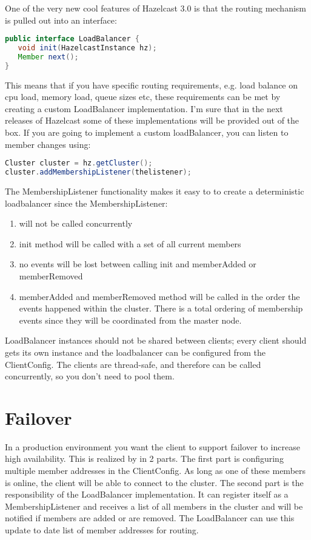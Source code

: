 One of the very new cool features of Hazelcast 3.0 is that the routing mechanism is pulled out into an interface:
\begin{lstlisting}[language=java]
public interface LoadBalancer {
   void init(HazelcastInstance hz);
   Member next();
}
\end{lstlisting}
This means that if you have specific routing requirements, e.g. load balance on cpu load, memory load, queue sizes etc, these requirements can be met by creating a custom LoadBalancer implementation. I'm sure that in the next releases of Hazelcast some of these implementations will be provided out of the box. If you are going to implement a custom loadBalancer, you can listen to member changes using:
\begin{lstlisting}[language=java]
Cluster cluster = hz.getCluster();
cluster.addMembershipListener(thelistener);
\end{lstlisting}

The MembershipListener functionality makes it easy to to create a deterministic loadbalancer since the MembershipListener:
\begin{enumerate}
\item will not be called concurrently
\item init method will be called with a set of all current members
\item no events will be lost between calling init and memberAdded or memberRemoved
\item memberAdded and memberRemoved method will be called in the order the events happened within the cluster. There is a total ordering of membership events since they will be coordinated from the master node.
\end{enumerate}

LoadBalancer instances should not be shared between clients; every client should gets its own instance and the loadbalancer can be configured from the ClientConfig. The clients are thread-safe, and therefore can be called concurrently, so you don't need to pool them.

\section{Failover} 
In a production environment you want the client to support failover to increase high availability. This is realized by in 2 parts. The first part is configuring multiple member addresses in the ClientConfig. As long as one of these members is online, the client will be able to connect to the cluster. The second part is the responsibility of the LoadBalancer implementation. It can register itself as a MembershipListener and receives a list of all members in the cluster and will be notified if members are added or are removed. The LoadBalancer can use this update to date list of member addresses for routing.

